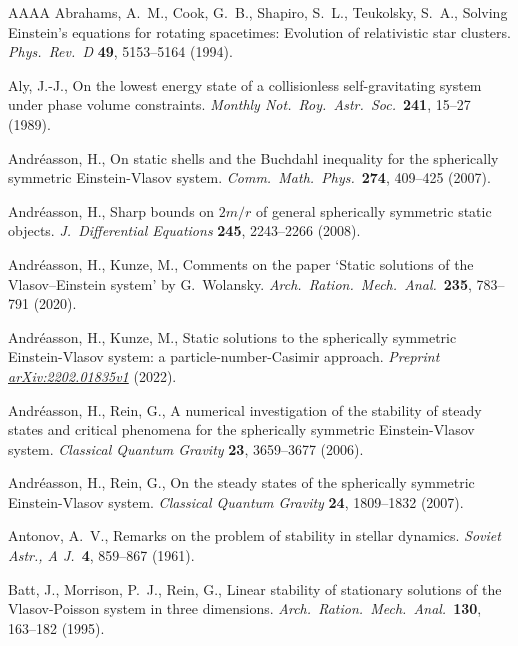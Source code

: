 \documentclass[11pt]{article}
\begin{document}
\begin{thebibliography}{AAAA}
  {\sc Abrahams, A.~M., Cook, G.~B., Shapiro, S.~L., Teukolsky, S.~A.},
  Solving Einstein's equations for rotating spacetimes:
  Evolution of relativistic star clusters.
  {\em Phys.\ Rev.\ D}
  {\bf 49}, 5153--5164 (1994).
  
  {\sc Aly, J.-J.},
  On the lowest energy state of a collisionless self-gravitating system
  under phase volume constraints.
  {\em Monthly Not.\ Roy.\ Astr.\ Soc.}\ 
  {\bf 241}, 15--27 (1989).

  {\sc Andr\'{e}asson, H.},
  On static shells and the Buchdahl inequality
  for the spherically symmetric Einstein-Vlasov system.
  {\em Comm.\ Math.\ Phys.}\ 
  {\bf 274}, 409--425 (2007).

  {\sc Andr\'{e}asson, H.},
  Sharp bounds on $2m/r$ of general spherically
  symmetric static objects.
  {\em J.~Differential Equations} 
  {\bf 245}, 2243--2266 (2008).

  {\sc Andr\'{e}asson, H., Kunze, M.},
  Comments on the paper ‘Static solutions of the Vlasov–Einstein system’
  by G.~Wolansky.
  {\em Arch.\ Ration.\ Mech.\ Anal.}\ 
  {\bf 235}, 783--791 (2020).
	
\bibitem{AnKu} %
  {\sc Andr\'{e}asson, H., Kunze, M.},
  Static solutions to the spherically symmetric Einstein-Vlasov system:
  a particle-number-Casimir approach.
  {\em Preprint \href{https://arxiv.org/abs/2202.01835v1}{arXiv:2202.01835v1}}
  (2022).
        
\bibitem{AnRe1} %
  {\sc Andr\'{e}asson, H., Rein, G.},
  A numerical investigation of the stability of steady states
  and critical phenomena for the spherically symmetric
  Einstein-Vlasov system.
  {\em Classical Quantum Gravity} 
  {\bf 23}, 3659--3677 (2006).

\bibitem{AnRe2} %
  {\sc Andr\'{e}asson, H., Rein, G.},
  On the steady states of the spherically symmetric
  Einstein-Vlasov system.
  {\em Classical Quantum Gravity} 
  {\bf 24}, 1809–1832 (2007).

\bibitem{An1961} %
  {\sc Antonov, A.~V.},
  Remarks on the problem of stability in stellar dynamics.
  {\em Soviet Astr., A J.}\
  {\bf 4}, 859--867 (1961).

\bibitem{BaMoRe95} %
  {\sc Batt, J., Morrison, P.~J., Rein, G.},
  Linear stability of stationary solutions of the Vlasov-Poisson
  system in three dimensions.
  {\em Arch.\ Ration.\ Mech.\ Anal.}\ 
  {\bf 130}, 163--182 (1995).
	

\end{thebibliography}
\end{document}
